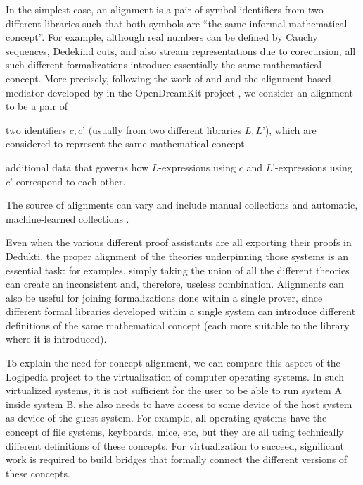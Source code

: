 In the simplest case, an alignment is a pair of symbol identifiers
from two different libraries such that both symbols are ``the same
informal mathematical concept''. For example, although real numbers
can be defined by Cauchy sequences, Dedekind cuts, and also stream
representations due to corecursion, all such different formalizations
introduce essentially the same mathematical concept. More precisely,
following the work of  and 
\cite{GKKMR:alignments:17} and the alignment-based mediator developed
by  in the OpenDreamKit project \cite{ODK:mitm:18}, we
consider an alignment to be a pair of
\begin{compactitem}
  \item two identifiers $c,c’$ (usually from two different libraries
    $L,L’$), which are considered to represent the same mathematical
    concept
  \item additional data that governs how $L$-expressions using $c$ and
    $L’$-expressions using $c’$ correspond to each other.
\end{compactitem}
The source of alignments can vary and include manual collections
\cite{MRLR:alignments:17} and automatic, machine-learned collections
\cite{align_kaliszyk}.

Even when the various different proof assistants are all exporting their
proofs in Dedukti, the proper alignment of the theories underpinning
those systems is an essential task: for examples, simply taking the
union of all the different theories can create an inconsistent and,
therefore, useless combination.
%
Alignments can also be useful for joining formalizations done within a
single prover, since different formal libraries developed within a
single system can introduce different definitions of the same
mathematical concept (each more suitable to the library where it is
introduced).

To explain the need for concept alignment, we can compare this aspect
of the Logipedia project to the virtualization of computer operating
systems. In such virtualized systems, it is not sufficient for the
user to be able to run system A inside system B, she also needs to
have access to some device of the host system as device of the guest
system. For example, all operating systems have the concept of file
systems, keyboards, mice, etc, but they are all using technically
different definitions of these concepts.  For virtualization to
succeed, significant work is required to build bridges that formally
connect the different versions of these concepts.

